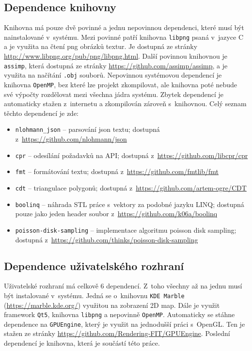 \subsection*{Dependence knihovny}
Knihovna má pouze dvě povinné a jednu nepovinnou dependenci, které musí být nainstalované v~systému. Mezi povinné patří knihovna \verb|libpng| psaná v~jazyce C a je využita na čtení png obrázků textur. Je dostupná ze stránky \href{http://www.libpng.org/pub/png/libpng.html}{http://www.libpng.org/pub/png/libpng.html}. Další povinnou knihovnou je \verb|assimp|, která dostupná ze stránky \href{https://github.com/assimp/assimp}{https://github.com/assimp/assimp}, a je využita na načítání \verb|.obj| souborů. Nepovinnou systémovou dependencí je knihovna \verb|OpenMP|, bez které lze projekt zkompilovat, ale knihovna poté nebude své výpočty rozdělovat mezi všechna jádra systému. Zbytek dependencí je automaticky stažen z~internetu a zkompilován zároveň s~knihovnou. Celý seznam těchto dependencí je zde:
\begin{itemize}
    \item \verb|nlohmann_json| -- parsování json textu; dostupná z~\href{https://github.com/nlohmann/json}{https://github.com/nlohmann/json}
    \item \verb|cpr| -- odesílání požadavků na API; dostupná
z~\href{https://github.com/libcpr/cpr}{https://github.com/libcpr/cpr}
    \item \verb|fmt| -- formátování textu; dostupná
z~\href{https://github.com/fmtlib/fmt}{https://github.com/fmtlib/fmt}
    \item \verb|cdt| -- triangulace polygonů; dostupná
z~\href{https://github.com/artem-ogre/CDT}{https://github.com/artem-ogre/CDT}
    \item \verb|boolinq| -- náhrada STL práce s~vektory za podobné jazyku LINQ; dostupná pouze jako jeden header soubor z~\href{https://github.com/k06a/boolinq}{https://github.com/k06a/boolinq}
    \item \verb|poisson-disk-sampling| -- implementace algoritmu poisson disk sampling; dostupná z~\href{https://github.com/thinks/poisson-disk-sampling}{https://github.com/thinks/poisson-disk-sampling}
\end{itemize}
\subsection*{Dependence uživatelského rozhraní}
Uživatelské rozhraní má celkově 6 dependencí. Z~toho všechny až na jednu musí být instalované v~systému. Jedná se o~knihovnu \verb|KDE Marble| (\href{https://marble.kde.org/}{https://marble.kde.org/}) využitou na zobrazení 2D map. Dále je využit framework \verb|Qt5|, knihovna \verb|libpng| a nepovinně \verb|OpenMP|. Automaticky se stáhne dependence na \verb|GPUEngine|, který je využit na jednodušší práci s~OpenGL. Ten je stažen ze stránky \href{https://github.com/Rendering-FIT/GPUEngine}{https://github.com/Rendering-FIT/GPUEngine}. Poslední dependencí je knihovna, která je součástí této práce.

